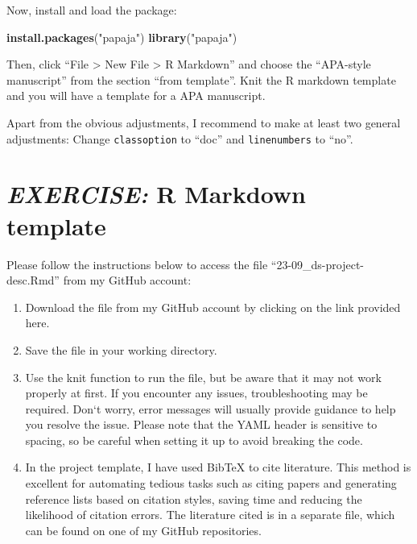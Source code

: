 \documentclass[
  12pt,
  oneside]{book}
\newenvironment{Shaded}{\begin{snugshade}}{\end{snugshade}}
\newcommand{\FunctionTok}[1]{\textcolor[rgb]{0.13,0.29,0.53}{\textbf{#1}}}
\newcommand{\NormalTok}[1]{#1}
\newcommand{\StringTok}[1]{\textcolor[rgb]{0.31,0.60,0.02}{#1}}
\providecommand{\tightlist}{%
  \setlength{\itemsep}{0pt}\setlength{\parskip}{0pt}}
\begin{document}
Now, install and load the package:

\begin{Shaded}
\begin{Highlighting}[]
\FunctionTok{install.packages}\NormalTok{(}\StringTok{"papaja"}\NormalTok{)}
\FunctionTok{library}\NormalTok{(}\StringTok{"papaja"}\NormalTok{)}
\end{Highlighting}
\end{Shaded}

Then, click ``File \textgreater{} New File \textgreater{} R Markdown'' and choose the ``APA-style manuscript'' from the section ``from template''. Knit the R markdown template and you will have a template for a APA manuscript.

Apart from the obvious adjustments, I recommend to make at least two general adjustments: Change \texttt{classoption} to ``doc'' and \texttt{linenumbers} to ``no''.

\hypertarget{exercise-r-markdown-template}{%
\section*{\texorpdfstring{\emph{EXERCISE:} R Markdown template}{EXERCISE: R Markdown template}}\label{exercise-r-markdown-template}}

Please follow the instructions below to access the file ``23-09\_ds-project-desc.Rmd'' from my GitHub account:

\begin{enumerate}
\def\labelenumi{\arabic{enumi}.}
\tightlist
\item
  Download the file from my GitHub account by clicking on the link provided here.
\item
  Save the file in your working directory.
\item
  Use the knit function to run the file, but be aware that it may not work properly at first. If you encounter any issues, troubleshooting may be required. Don`t worry, error messages will usually provide guidance to help you resolve the issue. Please note that the YAML header is sensitive to spacing, so be careful when setting it up to avoid breaking the code.
\item
  In the project template, I have used BibTeX to cite literature. This method is excellent for automating tedious tasks such as citing papers and generating reference lists based on citation styles, saving time and reducing the likelihood of citation errors. The literature cited is in a separate file, which can be found on one of my GitHub repositories.
\end{enumerate}
\end{document}
